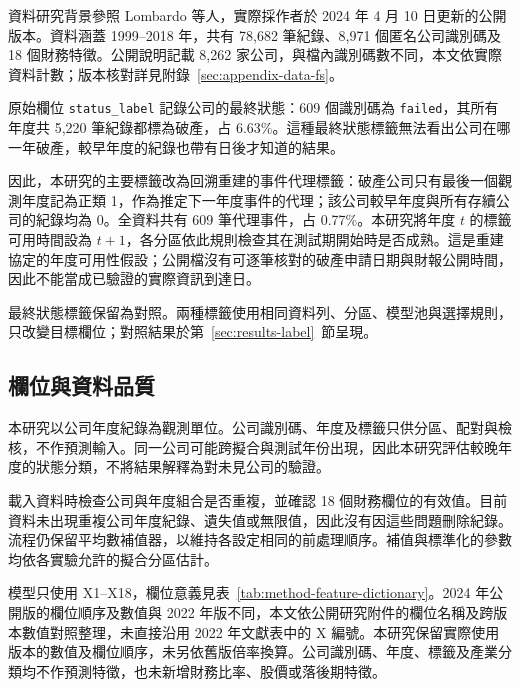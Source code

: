 資料研究背景參照 Lombardo 等人\autocite{lombardo2022bankruptcy}，實際採作者於 2024 年 4 月 10 日更新的公開版本\autocite{sowide-bankruptcy-data}。資料涵蓋 1999--2018 年，共有 78,682 筆紀錄、8,971 個匿名公司識別碼及 18 個財務特徵。公開說明記載 8,262 家公司，與檔內識別碼數不同，本文依實際資料計數；版本核對詳見附錄~\ref{sec:appendix-data-fs}。

原始欄位 \nolinkurl{status_label} 記錄公司的最終狀態：609 個識別碼為 \nolinkurl{failed}，其所有年度共 5,220 筆紀錄都標為破產，占 6.63\%。這種最終狀態標籤無法看出公司在哪一年破產，較早年度的紀錄也帶有日後才知道的結果。

因此，本研究的主要標籤改為回溯重建的事件代理標籤：破產公司只有最後一個觀測年度記為正類 1，作為推定下一年度事件的代理；該公司較早年度與所有存續公司的紀錄均為 0。全資料共有 609 筆代理事件，占 0.77\%。本研究將年度 \(t\) 的標籤可用時間設為 \(t+1\)，各分區依此規則檢查其在測試期開始時是否成熟。這是重建協定的年度可用性假設；公開檔沒有可逐筆核對的破產申請日期與財報公開時間，因此不能當成已驗證的實際資訊到達日。

最終狀態標籤保留為對照。兩種標籤使用相同資料列、分區、模型池與選擇規則，只改變目標欄位；對照結果於第~\ref{sec:results-label}~節呈現。

\subsection{欄位與資料品質}

本研究以公司年度紀錄為觀測單位。公司識別碼、年度及標籤只供分區、配對與檢核，不作預測輸入。同一公司可能跨擬合與測試年份出現，因此本研究評估較晚年度的狀態分類，不將結果解釋為對未見公司的驗證。

載入資料時檢查公司與年度組合是否重複，並確認 18 個財務欄位的有效值。目前資料未出現重複公司年度紀錄、遺失值或無限值，因此沒有因這些問題刪除紀錄。流程仍保留平均數補值器，以維持各設定相同的前處理順序。補值與標準化的參數均依各實驗允許的擬合分區估計。

模型只使用 X1--X18，欄位意義見表~\ref{tab:method-feature-dictionary}。2024 年公開版的欄位順序及數值與 2022 年版不同，本文依公開研究附件的欄位名稱及跨版本數值對照整理，未直接沿用 2022 年文獻表中的 X 編號\autocite{sowide-financial-supplement}。本研究保留實際使用版本的數值及欄位順序，未另依舊版倍率換算。公司識別碼、年度、標籤及產業分類均不作預測特徵，也未新增財務比率、股價或落後期特徵。


